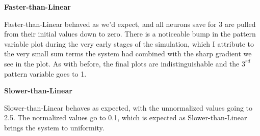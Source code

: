 \documentclass[a4paper,12pt]{article}
\begin{document}
\begin{figure}[h!]
\end{figure}

\begin{figure}[h!]
\begin{center}
\end{center}
\end{figure}

\vfil\eject

\bigskip
{\bf Faster-than-Linear}
\bigskip

Faster-than-Linear behaved as we'd expect, and all neurons save for 3 are pulled from their initial values down to zero. There is a noticeable bump in the pattern variable plot during the very early stages of the simulation, which I attribute to the very small sum terms the system had combined with the sharp gradient we see in the plot. As with before, the final plots are indistinguishable and the $3^{rd}$ pattern variable goes to 1. 

\begin{figure}[h!]
\end{figure}

\begin{figure}[h!]
\begin{center}
\end{center}
\end{figure}

\bigskip
{\bf Slower-than-Linear}
\bigskip

Slower-than-Linear behaves as expected, with the unnormalized values going to 2.5. The normalized values go to 0.1, which is expected as Slower-than-Linear brings the system to uniformity. 

\begin{figure}[h!]
\end{figure}

\begin{figure}[h!]
\begin{center}
\end{center}
\end{figure}
\end{document}
